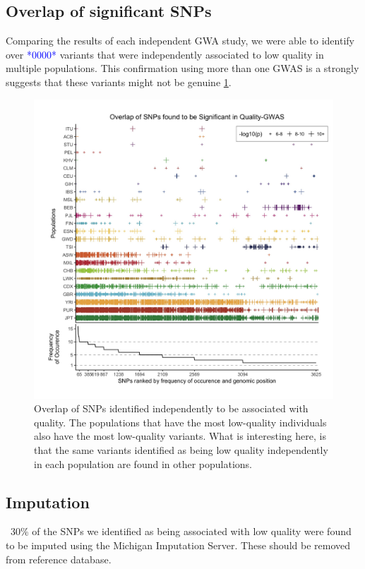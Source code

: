 \documentclass[9pt,lineno]{elife}
\newcommand{\todo}[1]{\textcolor{blue}{*#1*}}
\begin{document}
	\subsection{Overlap of significant SNPs}
Comparing the results of each independent GWA study, we were able to identify over \todo{0000} variants that were independently associated to low quality in multiple populations. This confirmation using more than one GWAS is a strongly suggests that these variants might not be genuine \ref{Figure3}. 

\begin{figure}
\includegraphics[width=\hsize,keepaspectratio]{SNPOverlap6.jpg}

\caption{Overlap of SNPs identified independently to be associated with quality. The populations that have the most low-quality individuals also have the most low-quality variants. What is interesting here, is that the same variants identified as being low quality independently in each population are found in other populations. }
  \label{Figure3}
\end{figure}

	\subsection{Imputation}
~30\% of the SNPs we identified as being associated with low quality were found to be imputed using the Michigan Imputation Server. These should be removed from reference database.
\end{document}

